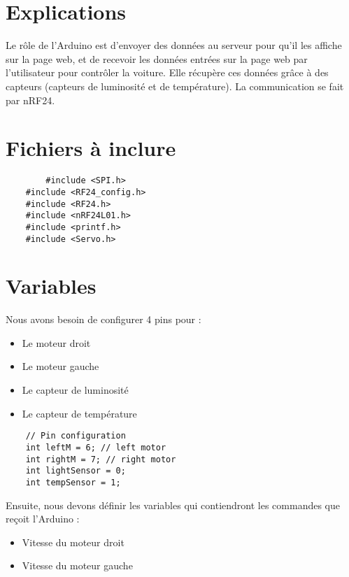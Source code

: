 \section{Explications}

Le rôle de l'Arduino est d'envoyer des données au serveur pour qu'il les affiche sur la
page web, et de recevoir les données entrées sur la page web par l'utilisateur pour contrôler
la voiture. Elle récupère ces données grâce à des capteurs (capteurs de luminosité et
de température). La communication se fait par nRF24.

\section{Fichiers à inclure}
\begin{DDbox}{\linewidth}
\begin{lstlisting}
        #include <SPI.h>
	#include <RF24_config.h>
	#include <RF24.h>
	#include <nRF24L01.h>
	#include <printf.h>
	#include <Servo.h>
\end{lstlisting}
\end{DDbox}

\section{Variables}

Nous avons besoin de configurer 4 pins pour :
\begin{itemize}
	\item Le moteur droit
	\item Le moteur gauche
	\item Le capteur de luminosité
	\item Le capteur de température
\end{itemize}
\bigbreak

\begin{DDbox}{\linewidth}
\begin{lstlisting}
	// Pin configuration
	int leftM = 6; // left motor
	int rightM = 7; // right motor
	int lightSensor = 0;
	int tempSensor = 1;

\end{lstlisting}
\end{DDbox}

Ensuite, nous devons définir les variables qui contiendront les commandes que reçoit
l'Arduino :
\begin{itemize}
	\item Vitesse du moteur droit
	\item Vitesse du moteur gauche
\end{itemize}

